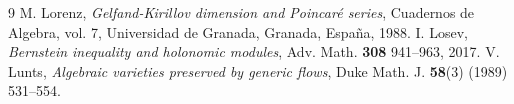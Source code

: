 \documentclass[12pt, a4paper]{amsart}
\begin{document}
\begin{thebibliography}{9}
{\sc M. Lorenz},
{\em Gelfand-Kirillov dimension and Poincaré series}, Cuadernos de Algebra, vol. 7, Universidad de Granada, Granada, España, 1988.
{\sc I. Losev},
{\em Bernstein inequality and holonomic modules},
Adv. Math. {\bf 308} 941--963, 2017.
{\sc V. Lunts},
{\em Algebraic varieties preserved by generic flows},
Duke Math. J. {\bf 58}(3) (1989) 531--554.

\end{thebibliography}
\end{document}
